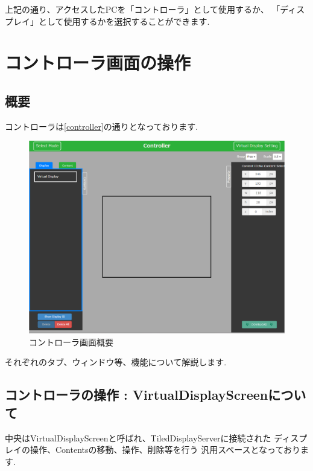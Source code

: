 \documentclass[a4paper,10pt,oneside]{jsbook}
\begin{document}
上記の通り、アクセスしたPCを「コントローラ」として使用するか、
「ディスプレイ」として使用するかを選択することができます.\\

\newpage


\chapter{コントローラ画面の操作}
\section{概要}
コントローラは\ref{controller}の通りとなっております.\\
\begin{figure}[htbp]
	\begin{center}
		\includegraphics[width=15.5cm]{image/cont_1.PNG}
	\end{center}
	\caption{コントローラ画面概要}
	\label{fig:controller}
\end{figure}

それぞれのタブ、ウィンドウ等、機能について解説します.\\

\newpage


\section{コントローラの操作 : VirtualDisplayScreenについて}
中央はVirtualDisplayScreenと呼ばれ、TiledDisplayServerに接続された
ディスプレイの操作、Contentsの移動、操作、削除等を行う
汎用スペースとなっております.\\
\end{document}
